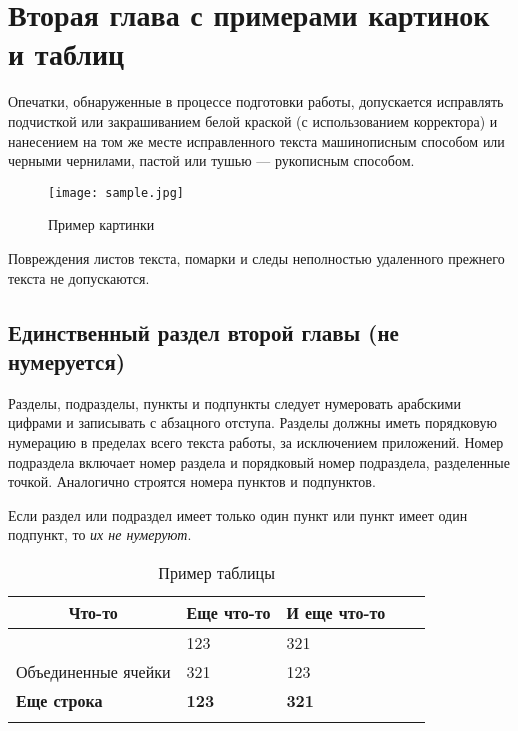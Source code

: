 \chapter{Вторая глава с примерами картинок и таблиц}

Опечатки, обнаруженные в процессе подготовки работы, допускается исправлять подчисткой или закрашиванием белой краской (с использованием корректора) и нанесением на том же месте исправленного текста машинописным способом или черными чернилами, пастой или тушью --- рукописным способом.

\begin{figure}[htbp]
	\centering
	\texttt{[image: sample.jpg]}
	\caption{Пример картинки}
	\label{fig:sample-figure}
\end{figure}

Повреждения листов текста, помарки и следы неполностью удаленного прежнего текста не допускаются.

\section*{Единственный раздел второй главы (не нумеруется)}

Разделы, подразделы, пункты и подпункты следует нумеровать арабскими цифрами и записывать с абзацного отступа. Разделы должны иметь порядковую нумерацию в пределах всего текста
работы, за исключением приложений. Номер подраздела включает номер раздела и порядковый номер подраздела, разделенные точкой. Аналогично строятся номера пунктов и подпунктов.

Если раздел или подраздел имеет только один пункт или пункт имеет один подпункт, то \textit{их не нумеруют}.

\begin{longtable}[c]{|l|l|l|ll}
	\cline{1-3}
	\multicolumn{1}{|c|}{Что-то} &
	\multicolumn{1}{c|}{Еще что-то} &
	\multicolumn{1}{c|}{И еще что-то} &
	&
	\\ \cline{1-3}
	\endhead
	& 123          & 321          &  &  \\ \cline{2-3}
	\multirow{-2}{*}{Объединенные ячейки} & 321          & 123          &  &  \\ \cline{1-3}
	\textbf{Еще строка}                   & \textbf{123} & \textbf{321} &  &  \\ \cline{1-3}
	\caption{Пример таблицы}
	\label{tab:table-sample}\\
\end{longtable}
